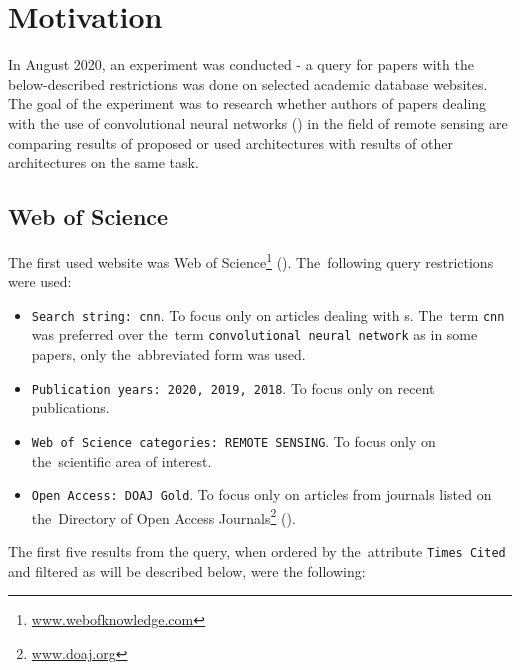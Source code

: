 \chapter{Motivation}
\label{motivation}

In August 2020, an experiment was conducted - a query for papers with the below-described restrictions was done on selected academic database websites. The goal of the experiment was to research whether authors of papers dealing with the use of convolutional neural networks () in the field of remote sensing are comparing results of proposed or used architectures with results of other architectures on the same task.

\section{Web of Science}
\label{wos}

The first used website was Web of Science\footnote{\url{www.webofknowledge.com}} (). The~following query restrictions were used:

\begin{itemize}
	\item \verb|Search string: cnn|. To focus only on articles dealing with s. The~term \verb|cnn| was preferred over the~term \verb|convolutional neural network| as in some papers, only the~abbreviated form was used.
	\item \verb|Publication years: 2020, 2019, 2018|. To focus only on recent publications.
	\item \verb|Web of Science categories: REMOTE SENSING|. To focus only on the~scientific area of interest.
	\item \verb|Open Access: DOAJ Gold|. To focus only on articles from journals listed on the~Directory of Open Access Journals\footnote{\url{www.doaj.org}} (). 
\end{itemize}

\noindent The first five results from the query, when ordered by the~attribute \verb|Times Cited| and filtered as will be described below, were the following:

